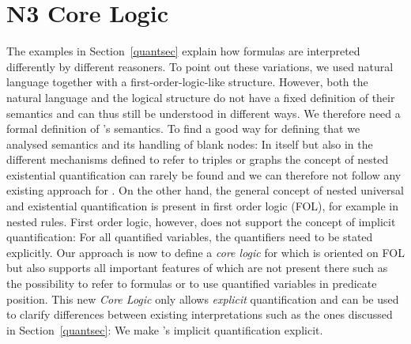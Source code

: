 \section{N3 Core Logic}\label{core}
The examples in Section~\ref{quantsec} explain how \nthree formulas are interpreted differently by different reasoners. 
To point out these variations,
we used natural language together with a
first-order-logic-like structure. However, both the natural language and the logical structure do not have a fixed definition of their semantics and can 
thus still be understood in different 
ways. 
We therefore need a formal definition of \nthree's semantics. 
To find a good way for defining that we analysed \rdf semantics and its handling of blank nodes: 
In \rdf itself but also in the different mechanisms defined to refer to triples or graphs the concept of nested existential quantification can rarely be found and we can therefore 
not follow any existing approach for \rdf. On the other hand, the general concept of nested universal and existential quantification 
is present in first order logic (FOL), for example in nested rules.  
First order logic, however, does not support the concept of implicit quantification: For all quantified variables, the quantifiers need to be stated explicitly. 
Our approach is now to define a \emph{core logic} for \nthree which is oriented on FOL but also supports all important features of \nthree which are not present there 
% 
% 
such as the possibility to refer to formulas or to use quantified variables in predicate position. 
This new \emph{\nthree Core Logic} only allows \emph{explicit} quantification and can be used to clarify differences between existing \nthree interpretations such as the ones discussed in 
Section~\ref{quantsec}:
% 
% 
We make \nthree's implicit quantification explicit.


